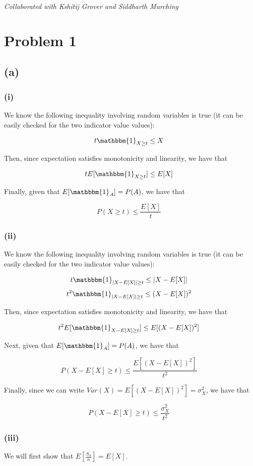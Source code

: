 \documentclass{article}
\begin{document}
\noindent \textit{Collaborated with Kshitij Grover and Siddharth Murching}

\section*{Problem 1}
\subsection*{(a)}
\subsubsection*{(i)}
We know the following inequality involving random variables is true (it can
be easily checked for the two indicator value values):

\[ t \mathbbm{1}_{X \geq t} \leq X \]

Then, since expectation satisfies monotonicity and linearity, we have that

\[ t E[\mathbbm{1}_{X \geq t}] \leq E[X] \]

Finally, given that $E[\mathbbm{1}_A] = P(A)$, we have that

\[ P(X \geq t) \leq \frac{E[X]}{t} \]

\subsubsection*{(ii)}
We know the following inequality involving random variables is true (it can
be easily checked for the two indicator value values):

\[ t \mathbbm{1}_{|X - E[X]| \geq t} \leq |X - E[X]| \]
\[ t^2 \mathbbm{1}_{|X - E[X]| \geq t} \leq (X - E[X])^2 \]

Then, since expectation satisfies monotonicity and linearity, we have that

\[ t^2 E[\mathbbm{1}_{X - E[X] \geq t}] \leq E[(X - E[X])^2] \]

Next, given that $E[\mathbbm{1}_A] = P(A)$, we have that

\[ P(X - E[X] \geq t) \leq \frac{E[(X - E[X])^2]}{t^2} \]

Finally, since we can write $Var(X) = E[(X - E[X])^2] = \sigma_X^2$, we have that

\[ P(X - E[X] \geq t) \leq \frac{\sigma_X^2}{t^2} \]

\subsubsection*{(iii)}
We will first show that $E[\frac{S_n}{n}] = E[X]$. 
\end{document}
